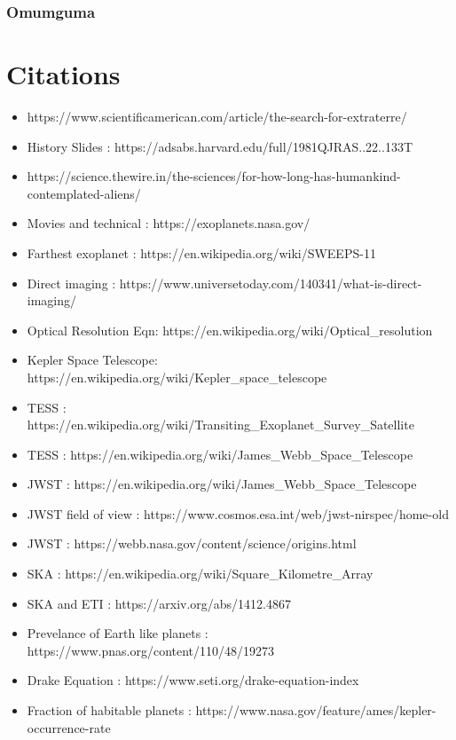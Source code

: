 \documentclass{beamer}
\begin{document}
\begin{frame}
\frametitle{Omumguma}
\end{frame}
%
%

\section{Citations}
\begin{frame}
\begin{itemize}
    \item \scriptsize{https://www.scientificamerican.com/article/the-search-for-extraterre/}
    \item History Slides : \scriptsize{https://adsabs.harvard.edu/full/1981QJRAS..22..133T}
    \item \scriptsize{https://science.thewire.in/the-sciences/for-how-long-has-humankind-contemplated-aliens/}
    \item Movies and technical : \scriptsize{https://exoplanets.nasa.gov/}
    \item Farthest exoplanet : \scriptsize{https://en.wikipedia.org/wiki/SWEEPS-11}
    \item Direct imaging : \scriptsize{https://www.universetoday.com/140341/what-is-direct-imaging/}
    \item Optical Resolution Eqn: \scriptsize{https://en.wikipedia.org/wiki/Optical\_resolution}
    \item Kepler Space Telescope: \scriptsize{https://en.wikipedia.org/wiki/Kepler\_space\_telescope}
    \item TESS : \scriptsize{https://en.wikipedia.org/wiki/Transiting\_Exoplanet\_Survey\_Satellite}
    \item TESS : \scriptsize{https://en.wikipedia.org/wiki/James\_Webb\_Space\_Telescope}
    \item JWST : \scriptsize{https://en.wikipedia.org/wiki/James\_Webb\_Space\_Telescope}
    \item JWST field of view : \scriptsize{https://www.cosmos.esa.int/web/jwst-nirspec/home-old}
    \item JWST : \scriptsize{https://webb.nasa.gov/content/science/origins.html}
    \item SKA : \scriptsize{https://en.wikipedia.org/wiki/Square\_Kilometre\_Array}
    \item SKA and ETI : \scriptsize{https://arxiv.org/abs/1412.4867}
    \item Prevelance of Earth like planets : \scriptsize{https://www.pnas.org/content/110/48/19273}
    \item Drake Equation : \scriptsize{https://www.seti.org/drake-equation-index}
    \item Fraction of habitable planets : \scriptsize{https://www.nasa.gov/feature/ames/kepler-occurrence-rate}
\end{itemize}
\end{frame}
\end{document}
